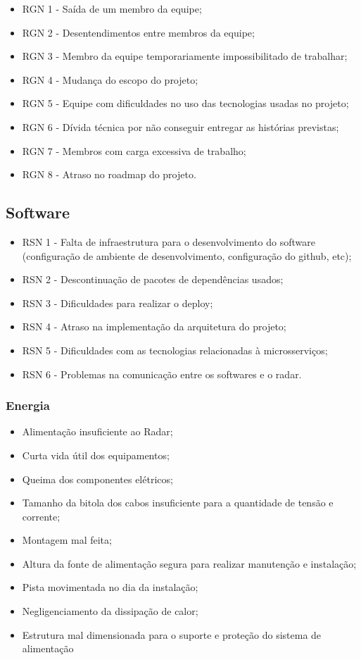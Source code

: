 \begin{itemize}
    \item RGN 1 - Saída de um membro da equipe;
    \item RGN 2 - Desentendimentos entre membros da equipe;
    \item RGN 3 - Membro da equipe temporariamente impossibilitado de trabalhar;
    \item RGN 4 - Mudança do escopo do projeto;
    \item RGN 5 - Equipe com dificuldades no uso das tecnologias usadas no projeto;
    \item RGN 6 - Dívida técnica por não conseguir entregar as histórias previstas;
    \item RGN 7 - Membros com carga excessiva de trabalho;
    \item RGN 8 - Atraso no roadmap do projeto.
\end{itemize}

\subsection{Software}
\begin{itemize}
    \item RSN 1 - Falta de infraestrutura para o desenvolvimento do software (configuração de ambiente de desenvolvimento, configuração do github, etc);
    \item RSN 2 - Descontinuação de pacotes de dependências usados;
    \item RSN 3 - Dificuldades para realizar o deploy;
    \item RSN 4 - Atraso na implementação da arquitetura do projeto;
    \item RSN 5 - Dificuldades com as tecnologias relacionadas à microsserviços;
    \item RSN 6 - Problemas na comunicação entre os softwares e o radar.
\end{itemize}

\subsubsection{Energia}
\begin{itemize}
   \item Alimentação insuficiente ao Radar;
   \item Curta vida útil dos equipamentos; 
   \item Queima dos componentes elétricos;
   \item Tamanho da bitola dos cabos insuficiente para a quantidade de tensão e corrente;
   \item Montagem mal feita;
   \item Altura da fonte de alimentação segura para realizar manutenção e instalação;
   \item Pista movimentada no dia da instalação;
   \item Negligenciamento da dissipação de calor;
   \item Estrutura mal dimensionada para o suporte e proteção do sistema de alimentação
\end{itemize}
